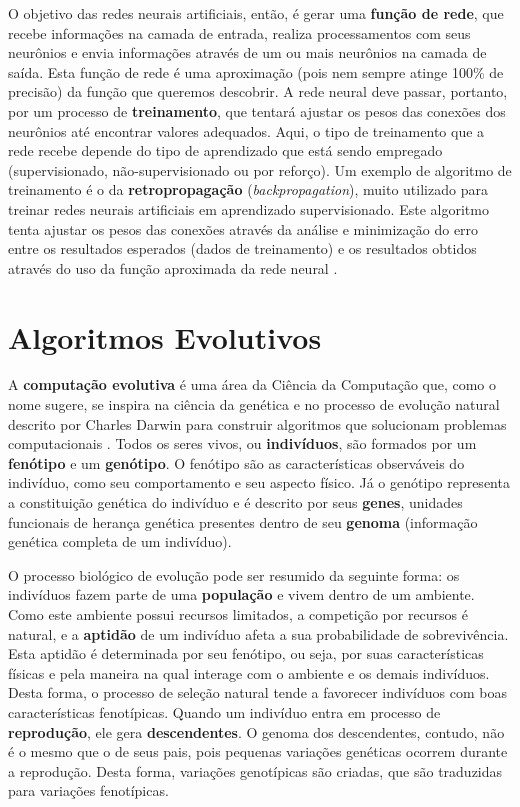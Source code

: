 O objetivo das redes neurais artificiais, então, é gerar uma \textbf{função de
rede}, que recebe informações na camada de entrada, realiza processamentos com
seus neurônios e envia informações através de um ou mais neurônios na camada de
saída. Esta função de rede é uma aproximação (pois nem sempre atinge 100\% de
precisão) da função que queremos descobrir. A rede neural deve passar, portanto,
por um processo de \textbf{treinamento}, que tentará ajustar os pesos das
conexões dos neurônios até encontrar valores adequados. Aqui, o tipo de
treinamento que a rede recebe depende do tipo de aprendizado que está sendo
empregado (supervisionado, não-supervisionado ou por reforço). Um exemplo de
algoritmo de treinamento é o da \textbf{retropropagação}
(\textit{backpropagation}), muito utilizado para treinar redes neurais
artificiais em aprendizado supervisionado. Este algoritmo tenta ajustar os pesos
das conexões através da análise e minimização do erro entre os resultados
esperados (dados de treinamento) e os resultados obtidos através do uso da
função aproximada da rede neural \cite[Cap. 7]{Rojas:1996:NNS:235222}.


\section{\label{section:evolutionary-algorithms}Algoritmos Evolutivos}
A \textbf{computação evolutiva} é uma área da Ciência da Computação que, como o
nome sugere, se inspira na ciência da genética e no processo de evolução
natural descrito por Charles Darwin para construir algoritmos que solucionam
problemas computacionais \cite[Cap. 2]{IntroEvolComputing}. Todos os seres
vivos, ou \textbf{indivíduos}, são formados por um \textbf{fenótipo} e um
\textbf{genótipo}. O fenótipo são as características observáveis do indivíduo,
como seu comportamento e seu aspecto físico. Já o genótipo representa a
constituição genética do indivíduo e é descrito por seus \textbf{genes},
unidades funcionais de herança genética presentes dentro de seu \textbf{genoma}
(informação genética completa de um indivíduo). 

O processo biológico de evolução pode ser resumido da seguinte forma: os
indivíduos fazem parte de uma \textbf{população} e vivem dentro de um ambiente.
Como este ambiente possui recursos limitados, a competição por recursos é
natural, e a \textbf{aptidão} de um indivíduo afeta a sua probabilidade de
sobrevivência. Esta aptidão é determinada por seu fenótipo, ou seja, por suas
características físicas e pela maneira na qual interage com o ambiente e os
demais indivíduos. Desta forma, o processo de seleção natural tende a favorecer
indivíduos com boas características fenotípicas.  Quando um indivíduo entra em
processo de \textbf{reprodução}, ele gera \textbf{descendentes}. O genoma dos
descendentes, contudo, não é o mesmo que o de seus pais, pois pequenas variações
genéticas ocorrem durante a reprodução. Desta forma, variações genotípicas são
criadas, que são traduzidas para variações fenotípicas. 

